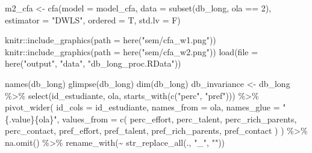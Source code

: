 \documentclass[
  12pt,
]{article}
\newenvironment{Shaded}{\begin{snugshade}}{\end{snugshade}}
\newcommand{\AttributeTok}[1]{\textcolor[rgb]{0.40,0.45,0.13}{#1}}
\newcommand{\DecValTok}[1]{\textcolor[rgb]{0.68,0.00,0.00}{#1}}
\newcommand{\FunctionTok}[1]{\textcolor[rgb]{0.28,0.35,0.67}{#1}}
\newcommand{\NormalTok}[1]{\textcolor[rgb]{0.00,0.23,0.31}{#1}}
\newcommand{\OtherTok}[1]{\textcolor[rgb]{0.00,0.23,0.31}{#1}}
\newcommand{\SpecialCharTok}[1]{\textcolor[rgb]{0.37,0.37,0.37}{#1}}
\newcommand{\StringTok}[1]{\textcolor[rgb]{0.13,0.47,0.30}{#1}}
\begin{document}
\begin{Shaded}
\begin{Highlighting}[]
\NormalTok{m2\_cfa }\OtherTok{\textless{}{-}} \FunctionTok{cfa}\NormalTok{(}\AttributeTok{model =}\NormalTok{ model\_cfa, }
              \AttributeTok{data =} \FunctionTok{subset}\NormalTok{(db\_long, ola }\SpecialCharTok{==} \DecValTok{2}\NormalTok{), }
              \AttributeTok{estimator =} \StringTok{"DWLS"}\NormalTok{,}
              \AttributeTok{ordered =}\NormalTok{ T,}
              \AttributeTok{std.lv =}\NormalTok{ F)}

\NormalTok{knitr}\SpecialCharTok{::}\FunctionTok{include\_graphics}\NormalTok{(}\AttributeTok{path =} \FunctionTok{here}\NormalTok{(}\StringTok{"sem/cfa\_w1.png"}\NormalTok{))}
\NormalTok{knitr}\SpecialCharTok{::}\FunctionTok{include\_graphics}\NormalTok{(}\AttributeTok{path =} \FunctionTok{here}\NormalTok{(}\StringTok{"sem/cfa\_w2.png"}\NormalTok{))}
\FunctionTok{load}\NormalTok{(}\AttributeTok{file =} \FunctionTok{here}\NormalTok{(}\StringTok{"output"}\NormalTok{, }\StringTok{"data"}\NormalTok{, }\StringTok{"db\_long\_proc.RData"}\NormalTok{))}

\FunctionTok{names}\NormalTok{(db\_long)}
\FunctionTok{glimpse}\NormalTok{(db\_long)}
\FunctionTok{dim}\NormalTok{(db\_long)}
\NormalTok{db\_invariance }\OtherTok{\textless{}{-}}
\NormalTok{  db\_long }\SpecialCharTok{\%\textgreater{}\%}
  \FunctionTok{select}\NormalTok{(id\_estudiante, ola, }\FunctionTok{starts\_with}\NormalTok{(}\FunctionTok{c}\NormalTok{(}\StringTok{"perc"}\NormalTok{, }\StringTok{"pref"}\NormalTok{))) }\SpecialCharTok{\%\textgreater{}\%}
  \FunctionTok{pivot\_wider}\NormalTok{(}
    \AttributeTok{id\_cols =}\NormalTok{ id\_estudiante,}
    \AttributeTok{names\_from =}\NormalTok{ ola,}
    \AttributeTok{names\_glue =} \StringTok{"\{.value\}\{ola\}"}\NormalTok{,}
    \AttributeTok{values\_from =} \FunctionTok{c}\NormalTok{(}
\NormalTok{      perc\_effort, perc\_talent,}
\NormalTok{      perc\_rich\_parents, perc\_contact,}
\NormalTok{      pref\_effort, pref\_talent,}
\NormalTok{      pref\_rich\_parents, pref\_contact}
\NormalTok{    )}
\NormalTok{  ) }\SpecialCharTok{\%\textgreater{}\%}
  \FunctionTok{na.omit}\NormalTok{() }\SpecialCharTok{\%\textgreater{}\%}
  \FunctionTok{rename\_with}\NormalTok{(}\SpecialCharTok{\textasciitilde{}} \FunctionTok{str\_replace\_all}\NormalTok{(., }\StringTok{"\_"}\NormalTok{, }\StringTok{""}\NormalTok{))}



\end{Highlighting}
\end{Shaded}
\end{document}
